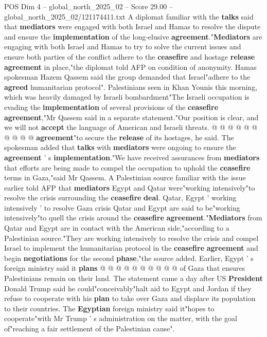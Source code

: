 \begin{textsample}{POS Dim 4 – global\_north\_2025\_02 – Score 29.00 – global\_north\_2025\_02/121174411.txt}
A diplomat familiar with the \textbf{talks} said that \textbf{mediators} were engaged with both Israel and Hamas to resolve the dispute and ensure the \textbf{implementation} of the long-elusive \textbf{agreement}."\textbf{Mediators} are engaging with both Israel and Hamas to try to solve the current issues and ensure both parties of the conflict adhere to the \textbf{ceasefire} and hostage \textbf{release} \textbf{agreement} in place,"the diplomat told AFP on condition of anonymity.
Hamas spokesman Hazem Qassem said the group demanded that Israel"adhere to the \textbf{agreed} humanitarian protocol".
Palestinians seen in Khan Younis this morning, which was heavily damaged by Israeli bombardment"The Israeli occupation is evading the \textbf{implementation} of several provisions of the \textbf{ceasefire} \textbf{agreement},"Mr Qassem said in a separate statement."Our position is clear, and we will not \textbf{accept} the language of American and Israeli threats. @ @ @ @ @ @ @ @ @ @ \textbf{agreement}"to secure the \textbf{release} of its hostages, he said.
The spokesman added that \textbf{talks} with \textbf{mediators} were ongoing to ensure the \textbf{agreement} ' s \textbf{implementation}."We have received assurances from \textbf{mediators} that efforts are being made to compel the occupation to uphold the \textbf{ceasefire} terms in Gaza,"said Mr Qassem.
A Palestinian source familiar with the issue earlier told AFP that \textbf{mediators} Egypt and Qatar were"working intensively"to resolve the crisis surrounding the \textbf{ceasefire} \textbf{deal}.
Qatar, Egypt ' working intensively ' to resolve Gaza crisis Qatar and Egypt are said to be"working intensively"to quell the crisis around the \textbf{ceasefire} \textbf{agreement}."\textbf{Mediators} from Qatar and Egypt are in contact with the American side,"according to a Palestinian source."They are working intensively to resolve the crisis and compel Israel to implement the humanitarian protocol in the \textbf{ceasefire} \textbf{agreement} and begin \textbf{negotiations} for the second \textbf{phase},"the source added.
Earlier, Egypt ' s foreign ministry said it \textbf{plans} @ @ @ @ @ @ @ @ @ @ of Gaza that ensures Palestinians remain on their land.
The statement came a day after US \textbf{President} Donald Trump said he could"conceivably"halt aid to Egypt and Jordan if they refuse to cooperate with his \textbf{plan} to take over Gaza and displace its population to their countries.
The \textbf{Egyptian} foreign ministry said it"hopes to cooperate"with Mr Trump ' s administration on the matter, with the goal of"reaching a fair settlement of the Palestinian cause".

\end{textsample}
